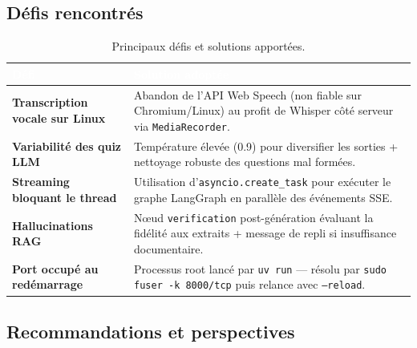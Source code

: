 \documentclass[11pt, a4paper]{article}
\begin{document}
\subsection{Défis rencontrés}

\begin{table}[H]
    \centering
    \sffamily\footnotesize\renewcommand{\arraystretch}{1.3}
    \begin{tabularx}{\textwidth}{>{\bfseries}p{4cm} X}
        \toprule
        \rowcolor{mypurple}
        \textcolor{white}{Défi} & \textcolor{white}{Solution adoptée} \\
        \midrule
        Transcription vocale sur Linux & Abandon de l'API Web Speech (non fiable sur Chromium/Linux) au profit de Whisper côté serveur via \texttt{MediaRecorder}. \\
        \rowcolor{codegray}
        Variabilité des quiz LLM & Température élevée (0.9) pour diversifier les sorties + nettoyage robuste des questions mal formées. \\
        Streaming bloquant le thread & Utilisation d'\texttt{asyncio.create\_task} pour exécuter le graphe LangGraph en parallèle des événements SSE. \\
        \rowcolor{codegray}
        Hallucinations RAG & Nœud \texttt{verification} post-génération évaluant la fidélité aux extraits + message de repli si insuffisance documentaire. \\
        Port occupé au redémarrage & Processus root lancé par \texttt{uv run} — résolu par \texttt{sudo fuser -k 8000/tcp} puis relance avec \texttt{--reload}. \\
        \bottomrule
    \end{tabularx}
    \caption{Principaux défis et solutions apportées.}
\end{table}

\subsection{Recommandations et perspectives}
\end{document}
